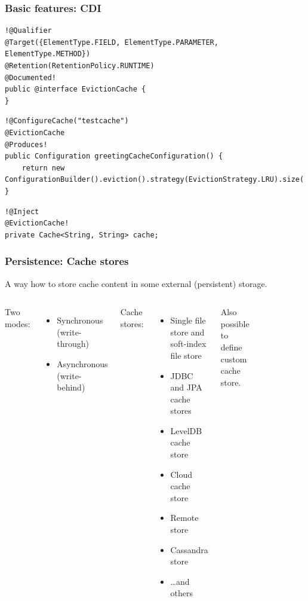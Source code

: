 \documentclass[10pt,utf8]{beamer}
\begin{document}
\begin{frame}[fragile]
	\frametitle{Basic features: CDI}
	\begin{lstlisting}[style=Java]
!@Qualifier
@Target({ElementType.FIELD, ElementType.PARAMETER, ElementType.METHOD})
@Retention(RetentionPolicy.RUNTIME)
@Documented!
public @interface EvictionCache {
}  
	\end{lstlisting}
	\begin{lstlisting}[style=Java]
!@ConfigureCache("testcache")
@EvictionCache
@Produces!
public Configuration greetingCacheConfiguration() {
    return new ConfigurationBuilder().eviction().strategy(EvictionStrategy.LRU).size(!5!).build();
}
	\end{lstlisting}
	\begin{lstlisting}[style=Java]
!@Inject
@EvictionCache!
private Cache<String, String> cache;
	\end{lstlisting}
\end{frame}

\begin{frame}
	\frametitle{Persistence: Cache stores}
	A way how to store cache content in some external (persistent) storage.\\
	\begin{columns}
	 {
		Two modes:
		\begin{itemize}
			\item Synchronous (write-through)
			\item Asynchronous (write-behind)
		\end{itemize}
	}
	 {
		Cache stores:
		\begin{itemize}
			\item Single file store and soft-index file store
			\item JDBC and JPA cache stores
			\item LevelDB cache store
			\item Cloud cache store
			\item Remote store
			\item Cassandra store
			\item \dots and others
		\end{itemize}
		Also possible to define custom cache store.
	}
		\begin{figure}
			\includegraphics[width=3cm]{./img/cache_store.eps}
		\end{figure}
	\end{columns}
\end{frame}
\end{document}
